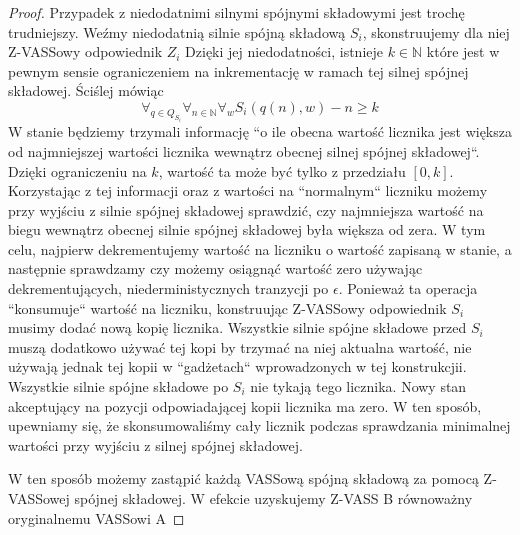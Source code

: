 \documentclass[magisterska]{pracamgr}
\newtheorem{proof}[theorem]{Dowód}
\begin{document}
\begin{proof}
        Przypadek z niedodatnimi silnymi spójnymi składowymi jest trochę trudniejszy.
        Weźmy niedodatnią silnie spójną składową $S_i$, skonstruujemy dla niej Z-VASSowy odpowiednik $Z_i$
        Dzięki jej niedodatności, istnieje $k \in \mathbb{N}$ które jest w pewnym sensie ograniczeniem na inkrementację w ramach tej silnej spójnej składowej.
        Ściślej mówiąc
        \[\forall_{q \in Q_{S_i}} \forall_{n \in \mathbb{N}} \forall_w S_i(q(n),w) - n \geq k\]
        W stanie będziemy trzymali informację ``o ile obecna wartość licznika jest większa od najmniejszej wartości licznika wewnątrz obecnej silnej spójnej składowej``.
        Dzięki ograniczeniu na $k$, wartość ta może być tylko z przedziału $[0,k]$.
        Korzystając z tej informacji oraz z wartości na ``normalnym`` liczniku możemy przy wyjściu z silnie spójnej składowej
        sprawdzić, czy najmniejsza wartość na biegu wewnątrz obecnej silnie spójnej składowej była większa od zera.
        W tym celu, najpierw dekrementujemy wartość na liczniku o wartość zapisaną w stanie, a następnie sprawdzamy czy możemy osiągnąć
        wartość zero używając dekrementujących, niederministycznych tranzycji po $\epsilon$.
        Ponieważ ta operacja ``konsumuje`` wartość na liczniku, konstruując Z-VASSowy odpowiednik $S_i$ musimy dodać nową kopię licznika.
        Wszystkie silnie spójne składowe przed $S_i$ muszą dodatkowo używać tej kopi by trzymać na niej aktualna wartość,
        nie używają jednak tej kopii w ``gadżetach`` wprowadzonych w tej konstrukcjii.
        Wszystkie silnie spójne składowe po $S_i$ nie tykają tego licznika.
        Nowy stan akceptujący na pozycji odpowiadającej kopii licznika ma zero.
        W ten sposób, upewniamy się, że skonsumowaliśmy cały licznik podczas sprawdzania minimalnej wartości przy wyjściu z silnej spójnej składowej.


        W ten sposób możemy zastąpić każdą VASSową spójną składową za pomocą Z-VASSowej spójnej składowej.
        W efekcie uzyskujemy Z-VASS B równoważny oryginalnemu VASSowi A
    \end{proof}
\end{document}
